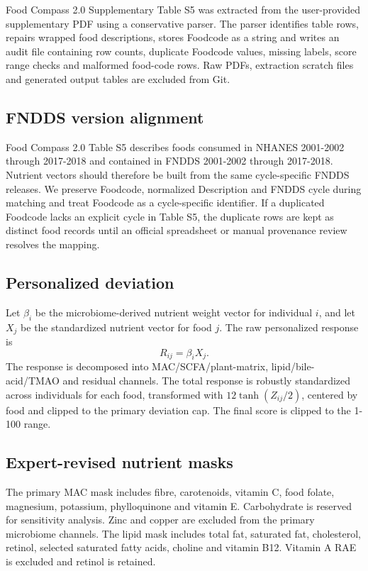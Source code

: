 Food Compass 2.0 Supplementary Table S5 was extracted from the user-provided
supplementary PDF using a conservative parser. The parser identifies table rows,
repairs wrapped food descriptions, stores Foodcode as a string and writes an
audit file containing row counts, duplicate Foodcode values, missing labels,
score range checks and malformed food-code rows. Raw PDFs, extraction scratch
files and generated output tables are excluded from Git.

\subsection*{FNDDS version alignment}

Food Compass 2.0 Table S5 describes foods consumed in NHANES 2001-2002 through
2017-2018 and contained in FNDDS 2001-2002 through 2017-2018. Nutrient vectors
should therefore be built from the same cycle-specific FNDDS releases. We
preserve Foodcode, normalized Description and FNDDS cycle during matching and
treat Foodcode as a cycle-specific identifier. If a duplicated Foodcode lacks an
explicit cycle in Table S5, the duplicate rows are kept as distinct food records
until an official spreadsheet or manual provenance review resolves the mapping.

\subsection*{Personalized deviation}

Let \(\beta_i\) be the microbiome-derived nutrient weight vector for individual
\(i\), and let \(X_j\) be the standardized nutrient vector for food \(j\). The
raw personalized response is
\[
  R_{ij} = \beta_i X_j.
\]
The response is decomposed into MAC/SCFA/plant-matrix, lipid/bile-acid/TMAO and
residual channels. The total response is robustly standardized across
individuals for each food, transformed with \(12 \tanh(Z_{ij}/2)\), centered by
food and clipped to the primary deviation cap. The final score is clipped to
the 1-100 range.

\subsection*{Expert-revised nutrient masks}

The primary MAC mask includes fibre, carotenoids, vitamin C, food folate,
magnesium, potassium, phylloquinone and vitamin E. Carbohydrate is reserved for
sensitivity analysis. Zinc and copper are excluded from the primary microbiome
channels. The lipid mask includes total fat, saturated fat, cholesterol,
retinol, selected saturated fatty acids, choline and vitamin B12. Vitamin A RAE
is excluded and retinol is retained.

